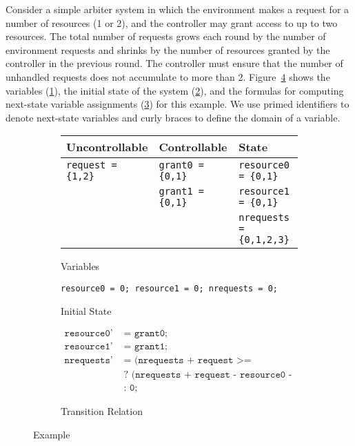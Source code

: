 Consider a simple arbiter system in which the environment makes a request for a number of resources (1 or 2), and the controller may grant access to up to two resources.  The total number of requests grows each round by the number of environment requests and shrinks by the number of resources granted by the controller in the previous round.  The controller must ensure that the number of unhandled requests does not accumulate to more than 2.  Figure~\ref{fig:example} shows the variables (\ref{fig:examplevars}), the initial state of the system (\ref{fig:exampleinit}), and the formulas for computing next-state variable assignments (\ref{fig:exampletrans}) for this example. We use primed identifiers to denote next-state variables and curly braces to define the domain of a variable.


\begin{figure}
    \begin{subfigure}[t]{\textwidth}
        \centering
        \begin{tabular}{l | l | l}
            \textbf{Uncontrollable} & \textbf{Controllable} & \textbf{State} \\
            \hline
            \texttt{request = \{1,2\}} & \texttt{grant0 = \{0,1\}} & \texttt{resource0 = \{0,1\}} \\
            & \texttt{grant1 = \{0,1\}} & \texttt{resource1 = \{0,1\}} \\
            & & \texttt{nrequests = \{0,1,2,3\}} \\
        \end{tabular}
        \caption{Variables}
        \label{fig:examplevars}
    \end{subfigure}

    \vspace{5mm}
    \begin{subfigure}[t]{\textwidth}
        \centering
        \texttt{resource0 = 0; resource1 = 0; nrequests = 0;}
        \caption{Initial State}
        \label{fig:exampleinit}
    \end{subfigure}

    \begin{subfigure}[t]{\textwidth}
        \begin {align*}
            \texttt{resource0'} & \texttt{ = grant0;} \\
            \texttt{resource1'} & \texttt{ = grant1;} \\
            \texttt{nrequests'} & \texttt{ = (nrequests + request >= resource0 + resource1)} \\ 
                                & \texttt{ ? (nrequests + request - resource0 - resource1)}\\
                                & \texttt{ : 0;}
        \end{align*}
        \caption{Transition Relation}
        \label{fig:exampletrans}
    \end{subfigure}
    \caption{Example}
    \label{fig:example}
\end{figure}


